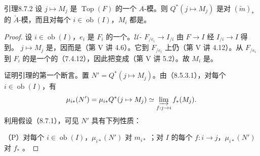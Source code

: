 \begin{SGAresult}{引理}{8.7.2}
设 $j\mapsto M_j$ 是 $\operatorname{Top}(F)$ 的一个 $A$-模。则 $Q^*(j\mapsto M_j)$ 是对 $(\underleftarrow m)_*$ 的 $\underrightarrow A$-模，而且对每个 $i\in\operatorname{ob}(I)$，$M_i$ 都是。
\end{SGAresult}
\begin{proof}
设 $i\in\operatorname{ob}(I)$，$e_i$ 是 $F_i$ 的一个。$\mathcal U$- $F_{/e_i}\to I_{/i}$ 由 $F\to I$ 经 $I_{/i}\to I$ 得到。 $j\mapsto M_j$ 是，因而是（第 V 讲 4.6）。它到 $F_{/e_i}$ 上仍（第 V 讲 4.12）。从 $F_{/e_i}$ 到 $F_i$ 的是一个的（7.4.12），因此把变成（第 V 讲 5.2）。故 $M_i$ 是。

证明引理的第一个断言。置 $N'=Q^*(j\mapsto M_j)$。由（8.5.3.1），对每个 $i\in\operatorname{ob}(I)$，有
\[
 \mu_{i*}(N')=\mu_{i*}Q^*(j\mapsto M_j)\simeq\varinjlim_{f:j\to i}f_*(M_j).
\]
利用假设（8.7.1），可见 $N'$ 具有下列性质：

（P）对每个 $i\in\operatorname{ob}(I)$，$\mu_{i*}(N')$ 对 $m_{i*}$ ；对 $I$ 的每个 $f:i\to j$，$\mu_{i*}(N')$ 对 $f_*$ 。


\end{proof}
